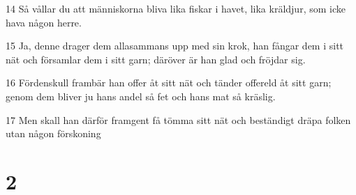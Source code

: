 \par 14 Så vållar du att människorna bliva lika fiskar i havet, lika kräldjur, som icke hava någon herre.
\par 15 Ja, denne drager dem allasammans upp med sin krok, han fångar dem i sitt nät och församlar dem i sitt garn; däröver är han glad och fröjdar sig.
\par 16 Fördenskull frambär han offer åt sitt nät och tänder offereld åt sitt garn; genom dem bliver ju hans andel så fet och hans mat så kräslig.
\par 17 Men skall han därför framgent få tömma sitt nät och beständigt dräpa folken utan någon förskoning

\chapter{2}

